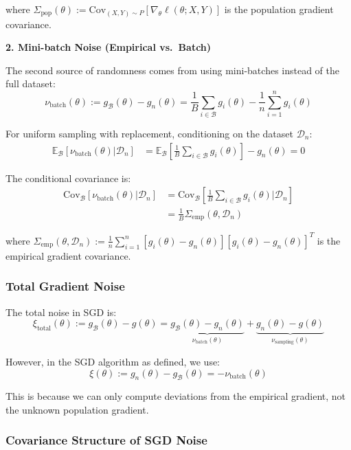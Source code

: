 \documentclass[11pt]{article}
\begin{document}
where $\Sigma_{\text{pop}}(\theta) := \text{Cov}_{(X,Y) \sim P}[\nabla_\theta \ell(\theta; X, Y)]$ is the population gradient covariance.

\textbf{2. Mini-batch Noise (Empirical vs.\ Batch)}

The second source of randomness comes from using mini-batches instead of the full dataset:
$$\nu_{\text{batch}}(\theta) := g_{\mathcal{B}}(\theta) - g_n(\theta) = \frac{1}{B} \sum_{i \in \mathcal{B}} g_i(\theta) - \frac{1}{n} \sum_{i=1}^n g_i(\theta)$$

For uniform sampling with replacement, conditioning on the dataset $\mathcal{D}_n$:
\begin{align}
\mathbb{E}_{\mathcal{B}}[\nu_{\text{batch}}(\theta) | \mathcal{D}_n] &= \mathbb{E}_{\mathcal{B}}\left[\frac{1}{B} \sum_{i \in \mathcal{B}} g_i(\theta)\right] - g_n(\theta) = 0
\end{align}

The conditional covariance is:
\begin{align}
\text{Cov}_{\mathcal{B}}[\nu_{\text{batch}}(\theta) | \mathcal{D}_n] &= \text{Cov}_{\mathcal{B}}\left[\frac{1}{B} \sum_{i \in \mathcal{B}} g_i(\theta) \bigg| \mathcal{D}_n\right] \\
&= \frac{1}{B} \Sigma_{\text{emp}}(\theta, \mathcal{D}_n)
\end{align}

where $\Sigma_{\text{emp}}(\theta, \mathcal{D}_n) := \frac{1}{n} \sum_{i=1}^n [g_i(\theta) - g_n(\theta)][g_i(\theta) - g_n(\theta)]^T$ is the empirical gradient covariance.

\subsubsection{Total Gradient Noise}

The total noise in SGD is:
$$\xi_{\text{total}}(\theta) := g_{\mathcal{B}}(\theta) - g(\theta) = \underbrace{g_{\mathcal{B}}(\theta) - g_n(\theta)}_{\nu_{\text{batch}}(\theta)} + \underbrace{g_n(\theta) - g(\theta)}_{\nu_{\text{sampling}}(\theta)}$$

However, in the SGD algorithm as defined, we use:
$$\xi(\theta) := g_n(\theta) - g_{\mathcal{B}}(\theta) = -\nu_{\text{batch}}(\theta)$$

This is because we can only compute deviations from the empirical gradient, not the unknown population gradient.

\subsubsection{Covariance Structure of SGD Noise}
\end{document}
